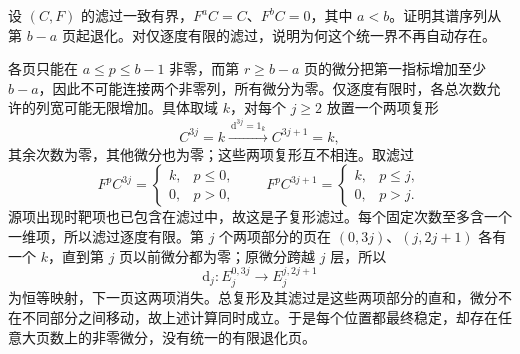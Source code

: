\begin{exercise}\label{b4:ex:14-stabilization-bound}
	设 \((C,F)\) 的滤过一致有界，\(F^aC=C\)、\(F^bC=0\)，其中 \(a<b\)。证明其谱序列从第 \(b-a\) 页起退化。对仅逐度有限的滤过，说明为何这个统一界不再自动存在。
\end{exercise}
\begin{solution}
	各页只能在 \(a\le p\le b-1\) 非零，而第 \(r\ge b-a\) 页的微分把第一指标增加至少 \(b-a\)，因此不可能连接两个非零列，所有微分为零。仅逐度有限时，各总次数允许的列宽可能无限增加。具体取域 \(k\)，对每个 \(j\ge2\) 放置一个两项复形
	\[
		C^{3j}=k\xrightarrow{\ \mathrm d^{3j}=1_k\ }C^{3j+1}=k,
	\]
	其余次数为零，其他微分也为零；这些两项复形互不相连。取滤过
	\[
		F^pC^{3j}=\begin{cases}k,&p\le0,\\0,&p>0,\end{cases}
		\qquad
		F^pC^{3j+1}=\begin{cases}k,&p\le j,\\0,&p>j.\end{cases}
	\]
	源项出现时靶项也已包含在滤过中，故这是子复形滤过。每个固定次数至多含一个一维项，所以滤过逐度有限。第 \(j\) 个两项部分的页在 \((0,3j)\)、\((j,2j+1)\) 各有一个 \(k\)，直到第 \(j\) 页以前微分都为零；原微分跨越 \(j\) 层，所以
	\[
		\mathrm d_j:E_j^{0,3j}\longrightarrow E_j^{j,2j+1}
	\]
	为恒等映射，下一页这两项消失。总复形及其滤过是这些两项部分的直和，微分不在不同部分之间移动，故上述计算同时成立。于是每个位置都最终稳定，却存在任意大页数上的非零微分，没有统一的有限退化页。
\end{solution}
